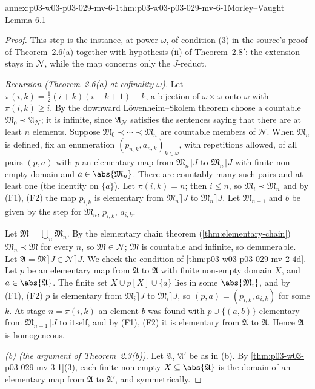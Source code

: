 \begin{annexitem}{annex:p03-w03-p03-029-mv-6-1}{thm:p03-w03-p03-029-mv-6-1}{Morley--Vaught Lemma 6.1}
\begin{proof}
This step is the instance, at power \(\omega\), of condition (3) in the
source's proof of Theorem~2.6(a) together with hypothesis (ii) of
Theorem~2.8\('\): the extension stays in \(\mathscr N\), while the map
concerns only the \(J\)-reduct.

\emph{Recursion (Theorem~2.6(a) at cofinality \(\omega\)).} Let
\(\pi(i,k)=\tfrac12(i+k)(i+k+1)+k\), a bijection of \(\omega\times\omega\)
onto \(\omega\) with \(\pi(i,k)\geq i\). By the downward
L\"owenheim--Skolem theorem choose a countable \(\mathfrak M_0\prec\mathfrak
A_{\mathscr N}\); it is infinite, since \(\mathfrak A_{\mathscr N}\) satisfies
the sentences saying that there are at least \(n\) elements. Suppose
\(\mathfrak M_0\prec\cdots\prec\mathfrak M_n\) are countable members of
\(\mathscr N\). When \(\mathfrak M_n\) is defined, fix an enumeration
\((p_{n,k},a_{n,k})_{k\in\omega}\), with repetitions allowed, of all pairs
\((p,a)\) with \(p\) an elementary map from \(\mathfrak M_n\rceil J\) to
\(\mathfrak M_n\rceil J\) with finite non-empty domain and
\(a\in\abs{\mathfrak M_n}\). There are countably many such pairs and at least
one (the identity on \(\{a\}\)). Let \(\pi(i,k)=n\); then \(i\leq n\), so
\(\mathfrak M_i\prec\mathfrak M_n\) and by (F1), (F2) the map \(p_{i,k}\) is
elementary from \(\mathfrak M_n\rceil J\) to \(\mathfrak M_n\rceil J\). Let
\(\mathfrak M_{n+1}\) and \(b\) be given by the step for \(\mathfrak M_n\),
\(p_{i,k}\), \(a_{i,k}\).

Let \(\mathfrak M=\bigcup_n\mathfrak M_n\). By the elementary chain theorem
(\cref{thm:elementary-chain}) \(\mathfrak M_n\prec\mathfrak M\) for every
\(n\), so \(\mathfrak M\in\mathscr N\); \(\mathfrak M\) is countable and
infinite, so denumerable. Let \(\mathfrak A=\mathfrak M\rceil J\in\mathscr
N\rceil J\). We check the condition of
\cref{thm:p03-w03-p03-029-mv-2-4d}. Let \(p\) be an elementary map from
\(\mathfrak A\) to \(\mathfrak A\) with finite non-empty domain \(X\), and
\(a\in\abs{\mathfrak A}\). The finite set \(X\cup p[X]\cup\{a\}\) lies in
some \(\abs{\mathfrak M_i}\), and by (F1), (F2) \(p\) is elementary from
\(\mathfrak M_i\rceil J\) to \(\mathfrak M_i\rceil J\), so
\((p,a)=(p_{i,k},a_{i,k})\) for some \(k\). At stage \(n=\pi(i,k)\) an
element \(b\) was found with \(p\cup\{(a,b)\}\) elementary from
\(\mathfrak M_{n+1}\rceil J\) to itself, and by (F1), (F2) it is elementary
from \(\mathfrak A\) to \(\mathfrak A\). Hence \(\mathfrak A\)
is homogeneous.

\emph{(b) (the argument of Theorem~2.3(b)).} Let \(\mathfrak A\),
\(\mathfrak A'\) be as in (b). By \cref{thm:p03-w03-p03-029-mv-3-1}(3),
each finite non-empty \(X\subseteq\abs{\mathfrak A}\) is the domain of an
elementary map from \(\mathfrak A\) to \(\mathfrak A'\), and symmetrically.


\end{proof}
\end{annexitem}
